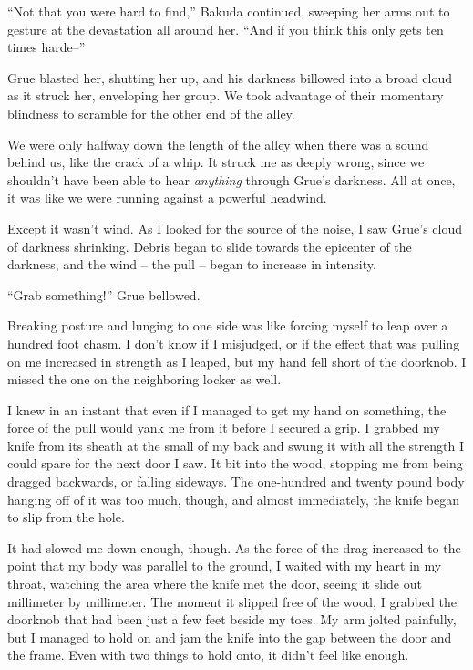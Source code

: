 ``Not that you were hard to find,'' Bakuda continued, sweeping her arms out to gesture at the devastation all around her.  ``And if you think this only gets ten times harde--''



Grue blasted her, shutting her up, and his darkness billowed into a broad cloud as it struck her, enveloping her group.  We took advantage of their momentary blindness to scramble for the other end of the alley.



We were only halfway down the length of the alley when there was a sound behind us, like the crack of a whip.  It struck me as deeply wrong, since we shouldn't have been able to hear \emph{anything} through Grue's darkness.  All at once, it was like we were running against a powerful headwind.



Except it wasn't wind.  As I looked for the source of the noise, I saw Grue's cloud of darkness shrinking.  Debris began to slide towards the epicenter of the darkness, and the wind – the pull – began to increase in intensity.



``Grab something!'' Grue bellowed.



Breaking posture and lunging to one side was like forcing myself to leap over a hundred foot chasm.  I don't know if I misjudged, or if the effect that was pulling on me increased in strength as I leaped, but my hand fell short of the doorknob.  I missed the one on the neighboring locker as well.



I knew in an instant that even if I managed to get my hand on something, the force of the pull would yank me from it before I secured a grip.  I grabbed my knife from its sheath at the small of my back and swung it with all the strength I could spare for the next door I saw.  It bit into the wood, stopping me from being dragged backwards, or falling sideways.  The one-hundred and twenty pound body hanging off of it was too much, though, and almost immediately, the knife began to slip from the hole.



It had slowed me down enough, though.  As the force of the drag increased to the point that my body was parallel to the ground, I waited with my heart in my throat, watching the area where the knife met the door, seeing it slide out millimeter by millimeter.  The moment it slipped free of the wood, I grabbed the doorknob that had been just a few feet beside my toes.  My arm jolted painfully, but I managed to hold on and jam the knife into the gap between the door and the frame.  Even with two things to hold onto, it didn't feel like enough.




